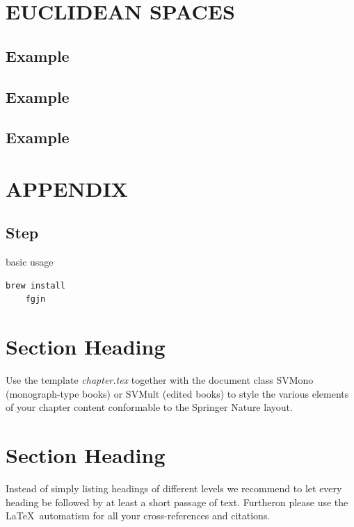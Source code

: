 \section{EUCLIDEAN SPACES}
\subsection*{\textbf{Example}}
\label{sec:36}

\subsection*{\textbf{Example}}
\label{sec:37}
\subsection*{\textbf{Example}}
\label{sec:38}

\section{APPENDIX}

\subsection*{\textbf{Step}}
\label{sec:37}












\label{sec:0}
\begin{programcode}{basic usage}
\begin{verbatim}
brew install
    fgjn
\end{verbatim}
\end{programcode}



\section{Section Heading}
\label{sec:1}
Use the template \emph{chapter.tex} together with the document class SVMono (monograph-type books) or SVMult (edited books) to style the various elements of your chapter content conformable to the Springer Nature layout.

\section{Section Heading}
\label{sec:2}
Instead of simply listing headings of different levels we recommend to let every heading be followed by at least a short passage of text. Furtheron please use the \LaTeX\ automatism for all your cross-references and citations.

